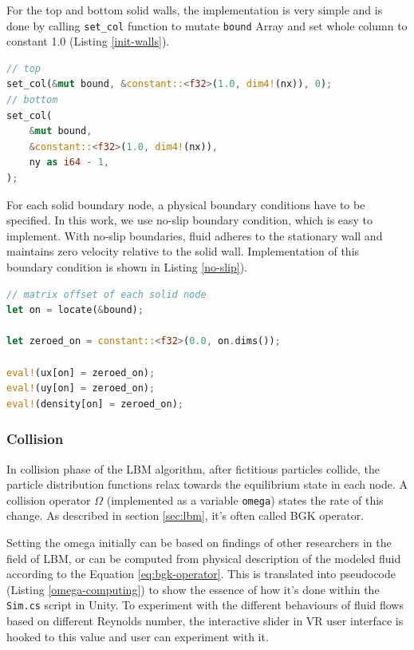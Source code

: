 For the top and bottom solid walls, the implementation is very simple and is done by calling \texttt{set\_col} function to mutate \texttt{bound} Array and set whole column to constant 1.0 (Listing \ref{init-walls}).

\begin{lstlisting}[language=Rust, caption=Setting the boundary conditions of a solid walls., label=init-walls]
// top
set_col(&mut bound, &constant::<f32>(1.0, dim4!(nx)), 0);
// bottom
set_col(
	&mut bound,
	&constant::<f32>(1.0, dim4!(nx)),
	ny as i64 - 1,
);
\end{lstlisting}

For each solid boundary node, a physical boundary conditions have to be specified. In this work, we use no-slip boundary condition, which is easy to implement. With no-slip boundaries, fluid adheres to the stationary wall and maintains zero velocity relative to the solid wall. Implementation of this boundary condition is shown in Listing \ref{no-slip}).

\begin{lstlisting}[language=Rust, caption=No-slip boundary conditions., label=no-slip]
// matrix offset of each solid node
let on = locate(&bound);

let zeroed_on = constant::<f32>(0.0, on.dims());

eval!(ux[on] = zeroed_on);
eval!(uy[on] = zeroed_on);
eval!(density[on] = zeroed_on);
\end{lstlisting}

\subsubsection{Collision}
In collision phase of the LBM algorithm, after fictitious particles collide, the particle distribution functions relax towards the equilibrium state in each node. A collision operator $\Omega$ (implemented as a variable \texttt{omega}) states the rate of this change. As described in section \ref{sec:lbm}, it's often called BGK operator.

Setting the omega initially can be based on findings of other researchers in the field of LBM, or can be computed from physical description of the modeled fluid according to the Equation \ref{eq:bgk-operator}. This is translated into pseudocode (Listing \ref{omega-computing}) to show the essence of how it's done within the \texttt{Sim.cs} script in Unity. To experiment with the different behaviours of fluid flows based on different Reynolds number, the interactive slider in VR user interface is hooked to this value and user can experiment with it. 

